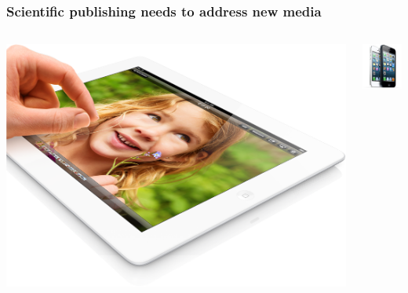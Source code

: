 \documentclass{beamer}
\begin{document}
\begin{frame}
\frametitle{Scientific publishing needs to address new media}

\begin{columns}
\begin{center}  %
  \centerline{\includegraphics[width=0.8\linewidth]{fig/ipad.png}}
\end{center}



\begin{center}  %
  \centerline{\includegraphics[width=0.3\linewidth]{fig/iphones.jpg}}
\end{center}





\end{columns}
\end{frame}
\end{document}
